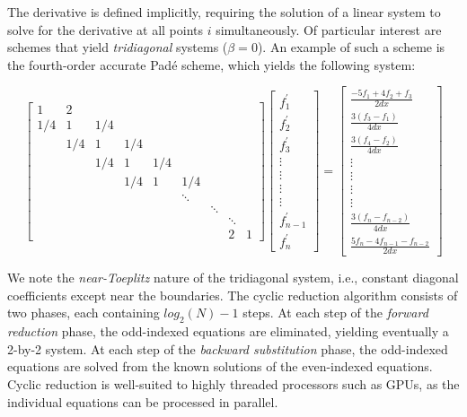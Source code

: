 \documentclass[letterpaper,10pt]{article}
\begin{document}
The derivative is defined implicitly,
requiring the solution of a linear system to solve for
the derivative at all points $i$ simultaneously.
Of particular interest are schemes that yield
\emph{tridiagonal} systems ($\beta=0$).
An example of such a scheme is the fourth-order accurate
Pad\'{e} scheme, which yields the following system:

\begin{equation}
 \label{eqn:compact-tridiagonal-system}
 \begin{bmatrix}
     1&2\\
     1/4&1&1/4\\
     &1/4&1&1/4\\
     &&1/4&1&1/4\\
     &&&1/4&1&1/4\\
     &&&&&\ddots\\
     &&&&&&\ddots\\
     &&&&&&&\ddots\\
     &&&&&&&2&1
  \end{bmatrix}
  \begin{bmatrix}
      f^{\prime}_1 \\

      f^{\prime}_2 \\
      f^{\prime}_3 \\
      \vdots \\
      \vdots \\
      \vdots \\
      \vdots \\
      f^{\prime}_{n-1} \\
      f^{\prime}_n
   \end{bmatrix}
 =
 \begin{bmatrix}
     \frac{-5f_1 + 4f_2 + f_3}{2dx}\\
     \frac{3(f_{3} - f_{1})}{4dx}\\
     \frac{3(f_{4} - f_{2})}{4dx}\\
     \vdots\\
     \vdots\\
     \vdots\\
     \vdots\\
     \frac{3(f_{n} - f_{n-2})}{4dx}\\
     \frac{5f_{n} - 4f_{n-1} - f_{n-2}}{2dx}
  \end{bmatrix}
\end{equation}

We note the \emph{near-Toeplitz} nature of the tridiagonal system,
i.e., constant diagonal coefficients except near the boundaries.
The cyclic reduction algorithm consists of two phases,
each containing $log_2(N)-1$ steps.
At each step of the \emph{forward reduction} phase,
the odd-indexed equations are eliminated, yielding eventually
a 2-by-2 system.
At each step of the \emph{backward substitution} phase,
the odd-indexed equations are solved from the known solutions
of the even-indexed equations.
Cyclic reduction is well-suited to highly threaded processors
such as GPUs, as the individual equations can be processed in parallel.
\end{document}
